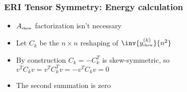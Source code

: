 \documentclass[bigger]{beamer}
\begin{document}
\begin{frame}
\frametitle{ERI Tensor Symmetry: Energy calculation}
\label{sec-1-26}
\begin{itemize}

\item $A_{\mbox{\tiny skew}}$ factorization isn't necessary
\label{sec-1-26-1}%

\item Let $C_k$ be the $n\times n$ reshaping of $\inv{y_{\mbox{\tiny skew}}^{(k)}}{n^2}$
\label{sec-1-26-2}%

\item By construction $C_k=-C_k^T$ is skew-symmetric, so $v^TC_kv=v^TC_k^Tv=-v^TC_kv=0$
\label{sec-1-26-3}%

\item The second summation is zero
\label{sec-1-26-4}%
\end{itemize} %
\end{frame}
\end{document}
